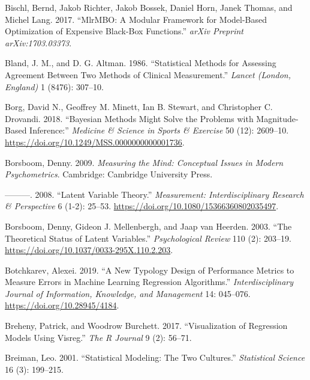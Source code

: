 \documentclass[
]{book}
\newlength{\cslhangindent}
\newenvironment{cslreferences}%
  {\setlength{\parindent}{0pt}%
  \everypar{\setlength{\hangindent}{\cslhangindent}}\ignorespaces}%
  {\par}
\begin{document}
\begin{cslreferences}
\leavevmode\hypertarget{ref-R-mlrmbo}{}%
Bischl, Bernd, Jakob Richter, Jakob Bossek, Daniel Horn, Janek Thomas, and Michel Lang. 2017. ``MlrMBO: A Modular Framework for Model-Based Optimization of Expensive Black-Box Functions.'' \emph{arXiv Preprint arXiv:1703.03373}.

\leavevmode\hypertarget{ref-blandStatisticalMethodsAssessing1986}{}%
Bland, J. M., and D. G. Altman. 1986. ``Statistical Methods for Assessing Agreement Between Two Methods of Clinical Measurement.'' \emph{Lancet (London, England)} 1 (8476): 307--10.

\leavevmode\hypertarget{ref-borgBayesianMethodsMight2018}{}%
Borg, David N., Geoffrey M. Minett, Ian B. Stewart, and Christopher C. Drovandi. 2018. ``Bayesian Methods Might Solve the Problems with Magnitude-Based Inference:'' \emph{Medicine \& Science in Sports \& Exercise} 50 (12): 2609--10. \url{https://doi.org/10.1249/MSS.0000000000001736}.

\leavevmode\hypertarget{ref-borsboomMeasuringMindConceptual2009}{}%
Borsboom, Denny. 2009. \emph{Measuring the Mind: Conceptual Issues in Modern Psychometrics}. Cambridge: Cambridge University Press.

\leavevmode\hypertarget{ref-borsboomLatentVariableTheory2008}{}%
---------. 2008. ``Latent Variable Theory.'' \emph{Measurement: Interdisciplinary Research \& Perspective} 6 (1-2): 25--53. \url{https://doi.org/10.1080/15366360802035497}.

\leavevmode\hypertarget{ref-borsboomTheoreticalStatusLatent2003}{}%
Borsboom, Denny, Gideon J. Mellenbergh, and Jaap van Heerden. 2003. ``The Theoretical Status of Latent Variables.'' \emph{Psychological Review} 110 (2): 203--19. \url{https://doi.org/10.1037/0033-295X.110.2.203}.

\leavevmode\hypertarget{ref-botchkarevNewTypologyDesign2019}{}%
Botchkarev, Alexei. 2019. ``A New Typology Design of Performance Metrics to Measure Errors in Machine Learning Regression Algorithms.'' \emph{Interdisciplinary Journal of Information, Knowledge, and Management} 14: 045--076. \url{https://doi.org/10.28945/4184}.

\leavevmode\hypertarget{ref-R-visreg}{}%
Breheny, Patrick, and Woodrow Burchett. 2017. ``Visualization of Regression Models Using Visreg.'' \emph{The R Journal} 9 (2): 56--71.

\leavevmode\hypertarget{ref-breimanStatisticalModelingTwo2001}{}%
Breiman, Leo. 2001. ``Statistical Modeling: The Two Cultures.'' \emph{Statistical Science} 16 (3): 199--215.


\end{cslreferences}
\end{document}
